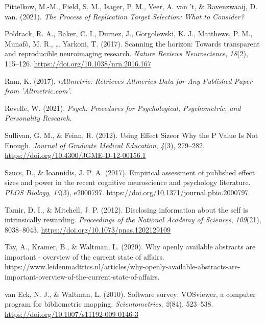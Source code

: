 \documentclass[
  man,floatsintext]{apa6}
\newlength{\cslhangindent}
\newlength{\cslentryspacingunit} %
\newenvironment{CSLReferences}[2] %
 {%
  \setlength{\parindent}{0pt}
  \ifodd #1
  \let\oldpar\par
  \def\par{\hangindent=\cslhangindent\oldpar}
  \fi
  \setlength{\parskip}{#2\cslentryspacingunit}
 }%
 {}
\begin{document}
\begin{CSLReferences}{1}{0}
\leavevmode{}%
Pittelkow, M.-M., Field, S. M., Isager, P. M., Veer, A. van 't, \& Ravenzwaaij, D. van. (2021). \emph{The {Process} of {Replication Target Selection}: {What} to {Consider}?}

\leavevmode{}%
Poldrack, R. A., Baker, C. I., Durnez, J., Gorgolewski, K. J., Matthews, P. M., Munafò, M. R., \ldots{} Yarkoni, T. (2017). Scanning the horizon: Towards transparent and reproducible neuroimaging research. \emph{Nature Reviews Neuroscience}, \emph{18}(2), 115--126. \url{https://doi.org/10.1038/nrn.2016.167}

\leavevmode{}%
Ram, K. (2017). \emph{{rAltmetric}: {Retrieves Altmerics Data} for {Any Published Paper} from '{Altmetric}.com'}.

\leavevmode{}%
Revelle, W. (2021). \emph{Psych: {Procedures} for {Psychological}, {Psychometric}, and {Personality Research}}.

\leavevmode{}%
Sullivan, G. M., \& Feinn, R. (2012). Using {Effect Size}\textemdash or {Why} the {P Value Is Not Enough}. \emph{Journal of Graduate Medical Education}, \emph{4}(3), 279--282. \url{https://doi.org/10.4300/JGME-D-12-00156.1}

\leavevmode{}%
Szucs, D., \& Ioannidis, J. P. A. (2017). Empirical assessment of published effect sizes and power in the recent cognitive neuroscience and psychology literature. \emph{PLOS Biology}, \emph{15}(3), e2000797. \url{https://doi.org/10.1371/journal.pbio.2000797}

\leavevmode{}%
Tamir, D. I., \& Mitchell, J. P. (2012). Disclosing information about the self is intrinsically rewarding. \emph{Proceedings of the National Academy of Sciences}, \emph{109}(21), 8038--8043. \url{https://doi.org/10.1073/pnas.1202129109}

\leavevmode{}%
Tay, A., Kramer, B., \& Waltman, L. (2020). Why openly available abstracts are important - overview of the current state of affairs. https://www.leidenmadtrics.nl/articles/why-openly-available-abstracts-are-important-overview-of-the-current-state-of-affairs.

\leavevmode{}%
van Eck, N. J., \& Waltman, L. (2010). Software survey: {VOSviewer}, a computer program for bibliometric mapping. \emph{Scientometrics}, \emph{2}(84), 523--538. \url{https://doi.org/10.1007/s11192-009-0146-3}


\end{CSLReferences}
\end{document}
